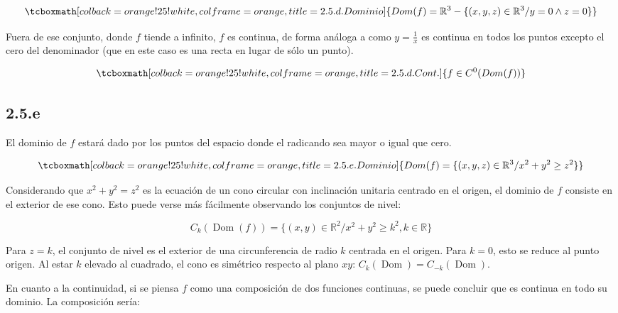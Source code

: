\documentclass{article}
\renewcommand{\Bbb}{\mathbb}
\begin{document}
\begin{equation}
\tcboxmath[colback=orange!25!white,colframe=orange,title=2.5.d. Dominio ]
{ \mathop{Dom}(f) = \Bbb R^3 - \{ (x,y,z) \in \Bbb R^3 / y = 0 \wedge z = 0 \} }
\end{equation}

Fuera de ese conjunto, donde $f$ tiende a infinito, $f$ es continua, de forma análoga a como $y = \frac{1}{x}$ es continua en todos los puntos excepto el cero del denominador (que en este caso es una recta en lugar de sólo un punto).

\begin{equation}
\tcboxmath[colback=orange!25!white,colframe=orange,title=2.5.d. Cont. ]
{ f \in C^0(\mathop{Dom(f)}) }
\end{equation}

\subsection*{2.5.e}
\label{subsec:2.5.e}

El dominio de $f$ estará dado por los puntos del espacio donde el radicando sea mayor o igual que cero.

\begin{equation}
\tcboxmath[colback=orange!25!white,colframe=orange,title=2.5.e. Dominio ]
{ \mathop{Dom}(f) = \{ (x,y,z) \in \Bbb R^3 / x^2 + y^2 \geq z^2 \} }
\end{equation}

Considerando que $x^2 + y^2 = z^2$ es la ecuación de un cono circular con inclinación unitaria centrado en el origen, el dominio de $f$ consiste en el exterior de ese cono. Esto puede verse más fácilmente observando los conjuntos de nivel:

\begin{equation}
C_k(\mathop{Dom}(f)) = \{ (x,y) \in \Bbb R^2 / x^2 + y^2 \geq k^2, k \in \Bbb R \}
\end{equation}

Para $z = k$, el conjunto de nivel es el exterior de una circunferencia de radio $k$ centrada en el origen. Para $k = 0$, esto se reduce al punto origen. Al estar $k$ elevado al cuadrado, el cono es simétrico respecto al plano $xy$: $C_k(\mathop{Dom(f)}) = C_{-k}(\mathop{Dom(f)})$.

En cuanto a la continuidad, si se piensa $f$ como una composición de dos funciones continuas, se puede concluir que es continua en todo su dominio. La composición sería:
\end{document}
